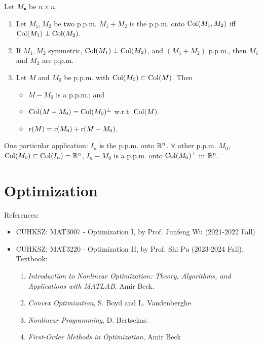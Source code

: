 \documentclass[10pt,a4paper]{book}
\begin{document}
\begin{thmbox}
	\begin{theorem}\label{thm:ppm_two}
		Let $M_{\bullet}$ be $n\times n$.
		\begin{enumerate}
			\item Let $M_1,M_2$ be two p.p.m. $M_1+M_2$ is the p.p.m. onto $\mathrm{Col}(M_1,M_2)$ iff $\mathrm{Col}(M_1)\perp \mathrm{Col}(M_2)$.
			\item If $M_1,M_2$ symmetric, $\mathrm{Col}(M_1)\perp \mathrm{Col}(M_2)$, and $(M_1+M_2)$ p.p.m., then $M_1$ and $M_2$ are p.p.m.   
			\item Let $M$ and $M_0$ be p.p.m. with $\mathrm{Col}(M_0)\subset \mathrm{Col}(M)$. Then 
			\begin{itemize}
				\item $M-M_0$ is a p.p.m.; and
				\item $\mathrm{Col}(M-M_0)=\mathrm{Col}(M_0)^\perp$ w.r.t. $\mathrm{Col}(M)$. 
				\item $\mathrm{r}(M)=\mathrm{r}(M_0)+\mathrm{r}(M-M_0)$. 
			\end{itemize}
		\end{enumerate}   
	\end{theorem}
\end{thmbox}
One particular application: $I_n$ is the p.p.m. onto $\mathbb R^n$. 
$\forall$ other p.p.m. $M_0$, $\mathrm{Col}(M_0)\subset\mathrm{Col}(I_n)=\mathbb R^n$, $I_n-M_0$ is a p.p.m. onto $\mathrm{Col}(M_0)^\perp$ in $\mathbb R^n$.        




\chapter{Optimization}\label{chap:opt}

References: 
\begin{itemize}
	\item CUHKSZ: MAT3007 - Optimization I, by Prof. Junfeng Wu (2021-2022 Fall)
	\item CUHKSZ: MAT3220 - Optimization II, by Prof. Shi Pu (2023-2024 Fall). Textbook: 
	\begin{enumerate}
		\item \textit{Introduction to Nonlinear Optimization: Theory, Algorithms, and
		Applications with MATLAB}, Amir Beck.
		\item \textit{Convex Optimization}, S. Boyd and L. Vandenberghe.
		\item \textit{Nonlinear Programming}, D. Bertsekas.
		\item \textit{First-Order Methods in Optimization}, Amir Beck
	\end{enumerate}
\end{itemize}
\end{document}
